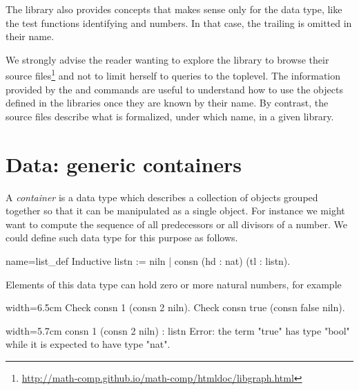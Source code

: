 The \mcbMC{} library also provides concepts that makes sense only
for the  data type, like the
test functions identifying  and  numbers. In that
case, the trailing  is omitted in their name.

We strongly advise the reader wanting to explore the \mcbMC{} library
to browse their source
files\footnote{\url{http://math-comp.github.io/math-comp/htmldoc/libgraph.html}}
and not to limit herself to queries to the toplevel. The
information provided by the  and  commands are
useful to understand how to use the objects defined in the libraries
once they are known by their name. By contrast, the source
files describe what is formalized, under which name, in a given library.




\section{Data: generic containers}\label{sec:poly}


A \emph{container} is a data type which describes a collection of
objects grouped together so that it can be manipulated as a single
object. For instance we might want to compute the sequence of all
predecessors or all divisors of a number.  We could define such data
type for this purpose as follows.

\begin{coq}{name=list_def}{}
Inductive listn := niln | consn (hd : nat) (tl : listn).
\end{coq}

Elements of this data type can hold zero or more natural numbers, for example

\begin{coq}{}{width=6.5cm}
Check consn 1 (consn 2 niln).
Check consn true (consn false niln).
$~$
$~$
\end{coq}{}{}
\begin{coqout}{}{width=5.7cm}
consn 1 (consn 2 niln) : listn
Error: the term "true" has
type "bool" while it is
expected to have type "nat".
\end{coqout}{}{}

